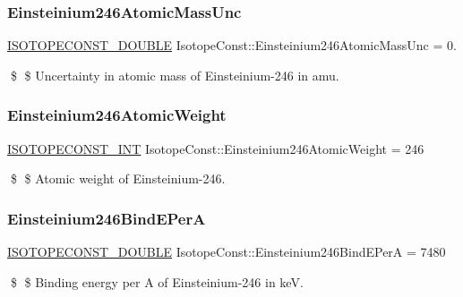 \subsubsection{\texorpdfstring{Einsteinium246\+Atomic\+Mass\+Unc}{Einsteinium246AtomicMassUnc}}
{\footnotesize\ttfamily \mbox{\hyperlink{group___isotope_const-_macros_ga8f45a7272ce02c0b4c65c44636ed719a}{I\+S\+O\+T\+O\+P\+E\+C\+O\+N\+S\+T\+\_\+\+D\+O\+U\+B\+LE}} Isotope\+Const\+::\+Einsteinium246\+Atomic\+Mass\+Unc = 0.}

\$ \$ Uncertainty in atomic mass of Einsteinium-\/246 in amu. \mbox{\label{group___isotope_const-_einsteinium-_es246_ga03fd3aaa8b0cba73bd15949641470a8a}} 
\subsubsection{\texorpdfstring{Einsteinium246\+Atomic\+Weight}{Einsteinium246AtomicWeight}}
{\footnotesize\ttfamily \mbox{\hyperlink{group___isotope_const-_macros_ga5f18360b3e99483a35c32d789e62621c}{I\+S\+O\+T\+O\+P\+E\+C\+O\+N\+S\+T\+\_\+\+I\+NT}} Isotope\+Const\+::\+Einsteinium246\+Atomic\+Weight = 246}

\$ \$ Atomic weight of Einsteinium-\/246. \mbox{\label{group___isotope_const-_einsteinium-_es246_ga73b9f2a47293fe1d6e42ad2ea6c03d7c}} 
\subsubsection{\texorpdfstring{Einsteinium246\+Bind\+E\+PerA}{Einsteinium246BindEPerA}}
{\footnotesize\ttfamily \mbox{\hyperlink{group___isotope_const-_macros_ga8f45a7272ce02c0b4c65c44636ed719a}{I\+S\+O\+T\+O\+P\+E\+C\+O\+N\+S\+T\+\_\+\+D\+O\+U\+B\+LE}} Isotope\+Const\+::\+Einsteinium246\+Bind\+E\+PerA = 7480}

\$ \$ Binding energy per A of Einsteinium-\/246 in keV. \mbox{\label{group___isotope_const-_einsteinium-_es246_ga9f8ffa169421a1dba804abbd30f0f1d7}} 
